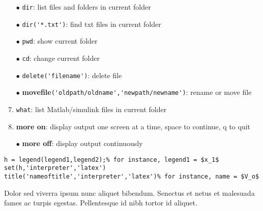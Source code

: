 \documentclass[8pt]{innovativeinnovation-cheatsheet}
\begin{document}
\begin{multicols*}{3}



\begin{enumerate}[leftmargin=*,nosep]
    \item[$\bullet$] \lstinline!dir!: list files and folders in current folder
    \item[$\bullet$] \lstinline!dir('*.txt')!: find txt files in current folder
    \item[$\bullet$] \lstinline!pwd!: show current folder
    \item[$\bullet$] \lstinline!cd!:  change current folder
    \item[$\bullet$] \lstinline!delete('filename')!: delete file
    \item[$\bullet$] {\color{innoinnored}\bfseries\ttfamily movefile}\lstinline{('oldpath/oldname','newpath/newname')}: rename or move file    
    \item[$\bullet$] \lstinline!what!: list Matlab/simulink files in current folder
    \item[$\bullet$] {\color{innoinnored}\bfseries\ttfamily more on}: display output one screen at a time, space to continue, q to quit
    \item[$\bullet$] {\color{innoinnored}\bfseries\ttfamily more off}: display output continuously
\end{enumerate}


\begin{lstlisting}
h = legend(legend1,legend2);% for instance, legend1 = $x_1$
set(h,'interpreter','latex')
title('nameoftitle','interpreter','latex')% for instance, name = $V_o$
\end{lstlisting}


Dolor sed viverra ipsum nunc aliquet bibendum. Senectus et netus et malesuada
fames ac turpis egestas. Pellentesque id nibh tortor id aliquet.

\vfill


\end{multicols*}
\end{document}
